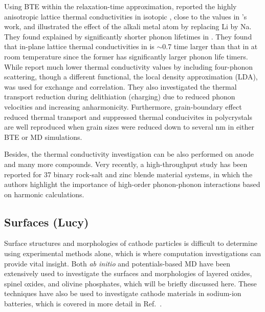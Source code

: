 \documentclass[../main.tex]{subfiles}
\begin{document}
Using BTE within the relaxation-time approximation, \citeauthor{mattila2020lattice} reported the highly anisotropic lattice thermal conductivities in isotopic , close to the values in \citeauthor{yang2019highly}'s work\cite{yang2019highly,yang2020chemical}, and illustrated the effect of the alkali metal atom by replacing Li by Na.\cite{mattila2020lattice} They found explained by significantly shorter phonon lifetimes in . They found that in-plane lattice thermal conductivities in  is $\sim$0.7 time larger than that in  at room temperature since the former has significantly larger phonon life timers. While \citeauthor{feng2020quantum} report much lower thermal conductivity values by including four-phonon scattering, though a different functional, the local density approximation (LDA), was used for exchange and correlation.\cite{feng2020quantum} They also investigated the thermal transport reduction during delithiation (charging) due to reduced phonon velocities and increasing anharmonicity. Furthermore, grain-boundary effect reduced thermal transport and  suppressed thermal conducivites in polycrystals are well reproduced when grain sizes were reduced down to several nm in either BTE or MD simulations. \cite{he2019thermal}

Besides, the thermal conductivity investigation can be also performed on anode and many more compounds.\cite{qian2016anisotropic, wei2018tunable} Very recently, a high-throughput study has been reported for 37 binary rock-salt and zinc blende material systems, in which the authors highlight the importance of high-order phonon-phonon interactions based on harmonic calculations. \cite{xia2020high}

\subsection{Surfaces (Lucy)}
Surface structures and morphologies of cathode particles is difficult to determine using experimental methods alone, which is where computation investigations can provide vital insight.\cite{zhang2013nanomaterials} Both \textit{ab initio} and potentials-based MD have been extensively used to investigate the surfaces and morphologies of layered oxides, spinel oxides, and olivine phosphates, which will be briefly discussed here. These techniques have also be used to investigate cathode materials in sodium-ion batteries, which is covered in more detail in Ref.~.
\end{document}
